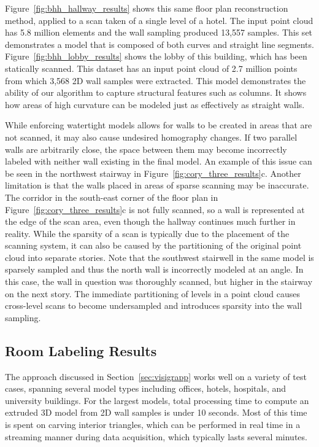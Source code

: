 \documentclass[12pt,onecolumn,oneside]{book}
\begin{document}
Figure~\ref{fig:bhh_hallway_results} shows this same floor plan reconstruction method, applied to a scan taken of a single level of a hotel.  The input point cloud has 5.8 million elements and the wall sampling produced 13,557 samples.  This set demonstrates a model that is composed of both curves and straight line segments. Figure~\ref{fig:bhh_lobby_results} shows the lobby of this building, which has been statically scanned.  This dataset has an input point cloud of 2.7 million points from which 3,568 2D wall samples were extracted. This model demonstrates the ability of our algorithm to capture structural features such as columns.  It shows how areas of high curvature can be modeled just as effectively as straight walls.

While enforcing watertight models allows for walls to be created in areas that are not scanned, it may also cause undesired homography changes.  If two parallel walls are arbitrarily close, the space between them may become incorrectly labeled with neither wall existing in the final model.  An example of this issue can be seen in the northwest stairway in Figure~\ref{fig:cory_three_results}c.  Another limitation is that the walls placed in areas of sparse scanning may be inaccurate.  The corridor in the south-east corner of the floor plan in Figure~\ref{fig:cory_three_results}c is not fully scanned, so a wall is represented at the edge of the scan area, even though the hallway continues much further in reality.  While the sparsity of a scan is typically due to the placement of the scanning system, it can also be caused by the partitioning of the original point cloud into separate stories.  Note that the southwest stairwell in the same model is sparsely sampled and thus the north wall is incorrectly modeled at an angle.  In this case, the wall in question was thoroughly scanned, but higher in the stairway on the next story.  The immediate partitioning of levels in a point cloud causes cross-level scans to become undersampled and introduces sparsity into the wall sampling.

\FloatBarrier
\subsection{Room Labeling Results}
\label{ssec:visigrapp_results}

The approach discussed in Section~\ref{sec:visigrapp} works well on a variety of test cases, spanning several model types including offices, hotels, hospitals, and university buildings.  For the largest models, total processing time to compute an extruded 3D model from 2D wall samples is under 10 seconds.  Most of this time is spent on carving interior triangles, which can be performed in real time in a streaming manner during data acquisition, which typically lasts several minutes.
\end{document}
